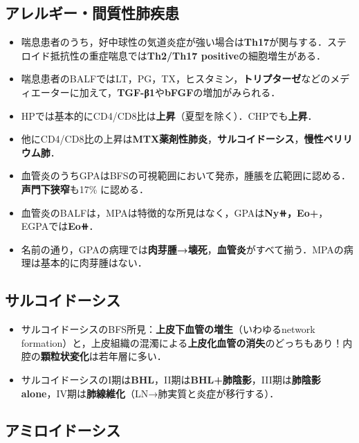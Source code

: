 \subsection{アレルギー・間質性肺疾患}
\begin{itemize}

\item 喘息患者のうち，好中球性の気道炎症が強い場合は\textbf{Th17}が関与する．ステロイド抵抗性の重症喘息では\textbf{Th2/Th17 positive}の細胞増生がある．
\item 喘息患者のBALFではLT，PG，TX，ヒスタミン，\textbf{トリプターゼ}などのメディエーターに加えて，\textbf{TGF-β1}や\textbf{bFGF}の増加がみられる．
\item HPでは基本的にCD4/CD8比は\textbf{上昇}（夏型を除く）．CHPでも\textbf{上昇}．
\item 他にCD4/CD8比の上昇は\textbf{MTX薬剤性肺炎}，\textbf{サルコイドーシス}，\textbf{慢性ベリリウム肺}．

\item 血管炎のうちGPAはBFSの可視範囲において発赤，腫脹を広範囲に認める．\textbf{声門下狭窄}も17\% に認める．
\item 血管炎のBALFは，MPAは特徴的な所見はなく，GPAは\textbf{Ny⧺，Eo+}，EGPAでは\textbf{Eo⧺}．
\item 名前の通り，GPAの病理では\textbf{肉芽腫→壊死}，\textbf{血管炎}がすべて揃う．MPAの病理は基本的に肉芽腫はない．

\end{itemize}

\subsection{サルコイドーシス}

\begin{itemize}

\item サルコイドーシスのBFS所見：\textbf{上皮下血管の増生}（いわゆるnetwork formation）と，上皮組織の混濁による\textbf{上皮化血管の消失}のどっちもあり！内腔の\textbf{顆粒状変化}は若年層に多い．
\item サルコイドーシスのI期は\textbf{BHL}，II期は\textbf{BHL+肺陰影}，III期は\textbf{肺陰影 alone}，IV期は\textbf{肺線維化}（LN→肺実質と炎症が移行する）．\end{itemize}

\subsection{アミロイドーシス}


